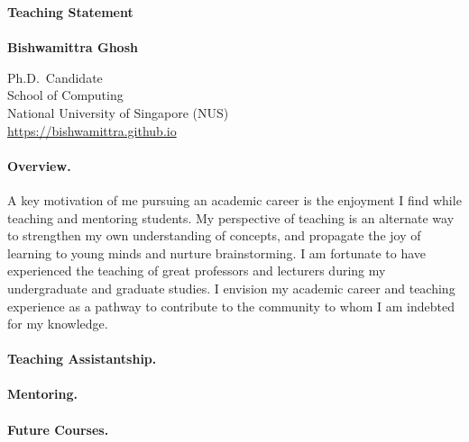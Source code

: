 \documentclass[11pt]{article}
\newcommand{\blue}[1]{\textcolor{blue}{#1}}
\begin{document}
	\noindent\huge \textbf{Teaching Statement} \\
	\vspace{0.1em}\\
	\Large \textbf{Bishwamittra Ghosh}
		
	\normalsize
	\noindent Ph.D.\ Candidate\\
	School of Computing\\
	National University of Singapore (NUS)\\
	\blue{\url{https://bishwamittra.github.io}}



	\paragraph{Overview.}
	A key motivation of me pursuing an academic career is the enjoyment I find while teaching and mentoring students. My perspective of teaching is an alternate way to strengthen my own understanding of concepts, and propagate the joy of learning to young minds and nurture brainstorming. I am fortunate to have experienced the teaching of great professors and lecturers during my undergraduate and graduate studies. I envision my academic career and teaching experience as a pathway to contribute to the  community to whom I am indebted for my knowledge.
	
	\paragraph{Teaching Assistantship.}
	
	\paragraph{Mentoring.}
	
	\paragraph{Future Courses.}
\end{document}
